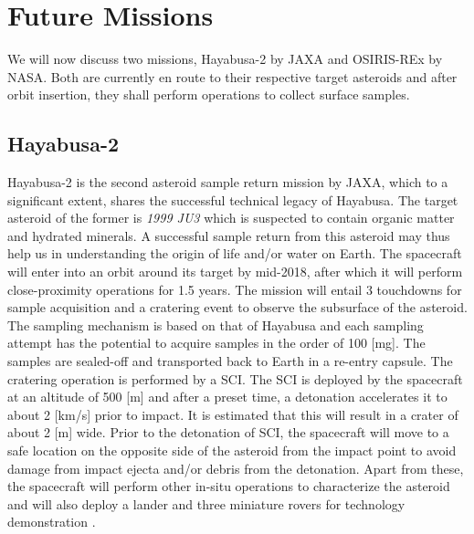 \section{Future Missions}
\label{sec:future_missions}
We will now discuss two missions, Hayabusa-2 by \gls{JAXA} and \gls{OSIRIS-REx} by \gls{NASA}. Both are currently en route to their respective target asteroids and after orbit insertion, they shall perform operations to collect surface samples.

\subsection{Hayabusa-2}
\label{subsec:hayabusa2_heritage}
Hayabusa-2 is the second asteroid sample return mission by \gls{JAXA}, which to a significant extent, shares the successful technical legacy of Hayabusa. The target asteroid of the former is \textit{1999 JU3} which is suspected to contain organic matter and hydrated minerals. A successful sample return from this asteroid may thus help us in understanding the origin of life and/or water on Earth. The spacecraft will enter into an orbit around its target by mid-2018, after which it will perform close-proximity operations for 1.5 years. The mission will entail 3 touchdowns for sample acquisition and a cratering event to observe the subsurface of the asteroid. The sampling mechanism is based on that of Hayabusa and each sampling attempt has the potential to acquire samples in the order of 100 [mg]. The samples are sealed-off and transported back to Earth in a re-entry capsule. The cratering operation is performed by a \gls{SCI}. The \gls{SCI} is deployed by the spacecraft at an altitude of 500 [m] and after a preset time, a detonation accelerates it to about 2 [km/s] prior to impact. It is estimated that this will result in a crater of about 2 [m] wide. Prior to the detonation of \gls{SCI}, the spacecraft will move to a safe location on the opposite side of the asteroid from the impact point to avoid damage from impact ejecta and/or debris from the detonation. Apart from these, the spacecraft will perform other in-situ operations to characterize the asteroid and will also deploy a lander and three miniature rovers for technology demonstration \parencite{TsudaHayabusa2SystemDesign}.

